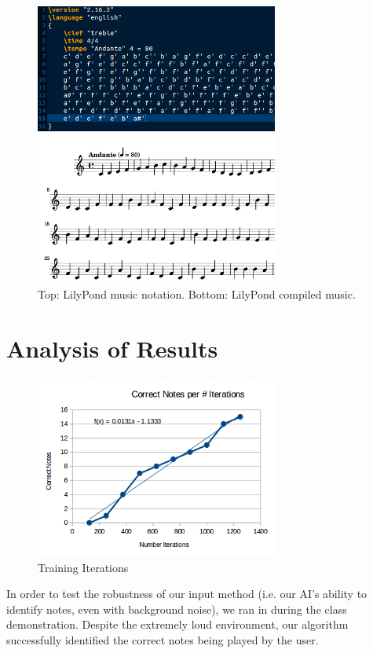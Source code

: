 \documentclass{chi2009}
\begin{document}
\begin{figure}[htp]
\centering
\includegraphics[width=8cm]{music_score}
\caption{Top: LilyPond music notation.  Bottom: LilyPond compiled music.}
\label{fig:lilypond}
\end{figure}

\section{Analysis of Results}

\begin{figure}[htp]
\centering
\includegraphics[width=8cm]{graph3}
\caption{Training Iterations}
\label{fig:training iterations}
\end{figure}

In order to test the robustness of our input method (i.e. our AI's ability to identify notes, even with background noise), we ran in during the class demonstration.  Despite the extremely loud environment, our algorithm successfully identified the correct notes being played by the user.
\end{document}

